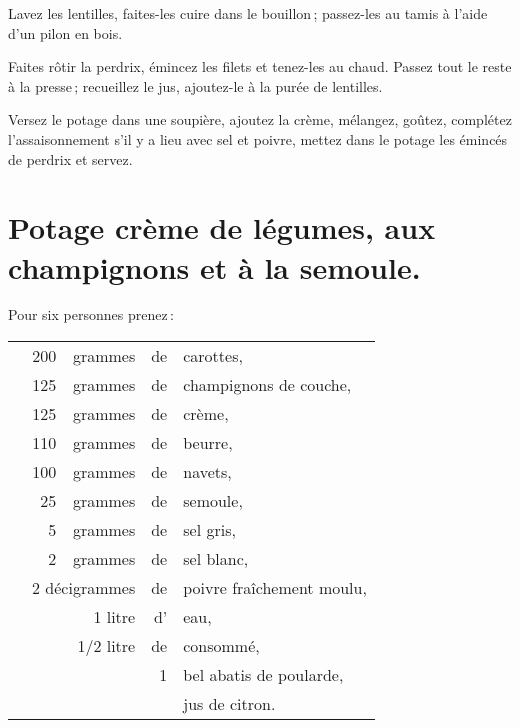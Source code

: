 Lavez les lentilles, faites-les cuire dans le bouillon ; passez-les au tamis
à l’aide d'un pilon en bois.

Faites rôtir la perdrix, émincez les filets et tenez-les au chaud. Passez tout le
reste à la presse ; recueillez le jus, ajoutez-le à la purée de lentilles.

Versez le potage dans une soupière, ajoutez la crème, mélangez, goûtez,
complétez l'assaisonnement s'il y a lieu avec sel et poivre, mettez dans le
potage les émincés de perdrix et servez.

\section*{\centering Potage crème de légumes, aux champignons et à la semoule.}

Pour six personnes prenez :

\medskip

\footnotesize
\begin{longtable}{rrrrp{16em}}   
  & 200 & grammes   & de & carottes,                                                                      \\
  & 125 & grammes   & de & champignons de couche,                                                         \\
  & 125 & grammes   & de & crème,                                                                         \\
  & 110 & grammes   & de & beurre,                                                                        \\
  & 100 & grammes   & de & navets,                                                                        \\
  &  25 & grammes   & de & semoule,                                                                       \\
  &   5 & grammes   & de & sel gris,                                                                      \\
  &   2 & grammes   & de & sel blanc,                                                                     \\
  & \multicolumn{2}{r}{2 décigrammes} & de & poivre fraîchement moulu,                                    \\
  &     & 1 litre   & d' & eau,                                                                           \\
  &     & 1/2 litre & de & consommé,                                                                      \\
  &     &           &  1 & bel abatis de poularde,                                                        \\
  &     &           &    & jus de citron.                                                                 \\
\end{longtable}
\normalsize

